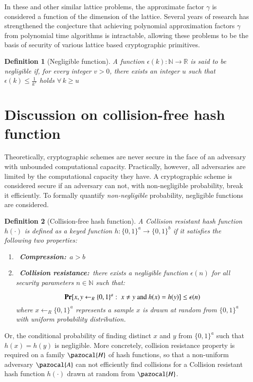 \documentclass[10pt]{elsarticle}
\newtheorem{definition}{Definition}
\begin{document}
In these and other similar lattice problems, the approximate factor
$\gamma$ is considered a function of the dimension of the lattice.
Several years of research has strengthened the conjecture that
achieving polynomial approximation factors $\gamma$ from polynomial
time algorithms is intractable, allowing these problems to be the
basis of security of various lattice based cryptographic primitives.

\begin{definition}[Negligible function]
\normalfont A function $\epsilon (k):\mathbb{N} \rightarrow
\mathbb{R}$ is said to be negligible if, for every integer $v>0$,
there exists an integer $u$ such that $\epsilon
(k)\leq\frac{1}{k^{v}}$ holds $\forall \, k\geq u$
\end{definition}

\section{Discussion on collision-free hash function}
Theoretically, cryptographic schemes are never secure in the face of
an adversary with unbounded computational capacity. Practically,
however, all adversaries are limited by the computational capacity
they have. A cryptographic scheme is considered secure if an
adversary can not, with non-negligible probability, break it
efficiently. To formally quantify \textit{non-negligible}
probability, negligible functions are considered.

\begin{definition}[Collision-free hash function]
\normalfont A Collision resistant hash function $h(\cdot)$ is
defined as a keyed function $h:\{0,1\}^{a}\rightarrow \{0,1\}^{b}$
if it satisfies the following two properties:
\begin{enumerate}[label=\textbf{(\arabic*).}]
\item~\textbf{Compression:}~$a>b$

\item~\textbf{Collision resistance:}~there exists a negligible function $\epsilon(n)$ for all security parameters $n\in\mathbb{N}$ such that:

$$\textbf{\mbox{Pr}}[x, y \leftarrow_{R}\{0,1\}^{a}:~x\neq y~\mbox{and}~h(x) = h(y)]\leq\epsilon(n)$$ where $x\leftarrow_{R}\{0,1\}^{a}$ represents a sample $x$ is drawn at random from $\{0,1\}^{a}$ with uniform probability distribution.
\end{enumerate}
\end{definition}
Or, the conditional probability of finding distinct $x$ and $y$ from
$\{0,1\}^{a}$ such that $h(x) = h(y)$ is negligible. More
concretely, collision resistance property is required on a family
$\pazocal{H}$ of hash functions, so that a non-uniform adversary
$\pazocal{A}$ can not efficiently find collisions for a Collision
resistant hash function $h(\cdot)$ drawn at random from
$\pazocal{H}$.
\end{document}
